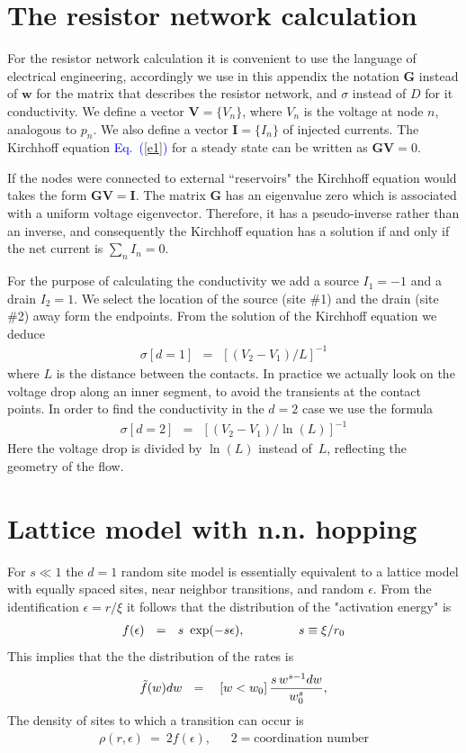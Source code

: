 \documentclass[aps,prb,floats,floatfix,twocolumn]{revtex4}
\newcommand{\mylabel}[1]{\label{#1}}
\newcommand{\beq}{\begin{eqnarray}}
\newcommand{\eeq}{\end{eqnarray}}
\newcommand{\be}[1]{\begin{eqnarray}\ifthenelse{#1=-1}
{\nonumber}{\ifthenelse{#1=0}{}{\mylabel{e#1}}}}
\newcommand{\Eq}[1]{\textcolor{blue}{Eq.\!\!~(\ref{#1})}}
\begin{document}
\section{The resistor network calculation}
\label{res}

For the resistor network calculation it is convenient 
to use the language of electrical engineering, 
accordingly we use in this appendix the notation $\bm{G}$ 
instead of $\bm{w}$ for the matrix that describes the 
resistor network, and $\sigma$ instead of $D$ for it conductivity. 
We define a vector $\bm{V}=\{V_n\}$, where $V_n$ is the voltage 
at node $n$, analogous to $p_n$. We also define a vector $\bm{I}=\{I_n\}$ 
of injected currents. The Kirchhoff equation \Eq{e1} for a steady 
state can be written as $\bm{G} \bm{V}=0$. 



If the nodes were connected to external ``reservoirs" 
the Kirchhoff equation would takes the form $\bm{G} \bm{V}=\bm{I}$. 
The matrix $\bm{G}$ has an eigenvalue zero which is associated  
with a uniform voltage eigenvector. Therefore, it has 
a pseudo-inverse rather than an inverse, and consequently 
the Kirchhoff equation has a solution if and only 
if the net current is ${\sum_n I_n=0}$.      


For the purpose of calculating the conductivity
we add a source ${I_1=-1}$ and a drain ${I_2=1}$.
We select the location of the source (site \#1) 
and the drain (site \#2) away form the endpoints. 
From the solution of the Kirchhoff equation we deduce 
%
\beq
\sigma [d{=}1] \ \ = \ \ \left[(V_2-V_1)/L\right]^{-1} 
\eeq
%
where $L$ is the distance between the contacts.   
In practice we actually look on the  
voltage drop along an inner segment, 
to avoid the transients at the contact points.
%
In order to find the conductivity in the $d{=}2$ case 
we use the formula 
%
\beq
\sigma [d{=}2] \ \ = \ \ \left[(V_2-V_1)/\ln(L)\right]^{-1} 
\eeq
%
Here the voltage drop is divided by $\ln(L)$ instead of~$L$, 
reflecting the geometry of the flow.




\section{Lattice model with n.n. hopping}

\label{aLattice}

For $s \ll 1$ the $d{=}1$ random site model is 
essentially equivalent to a lattice model 
with equally spaced sites, 
near neighbor transitions, 
and random $\epsilon$.
From the identification $\epsilon=r/\xi$ 
it follows that the distribution 
of the "activation energy" is 
%
\beq
f(\epsilon) \ \ = \ \ s \ \exp(-s\epsilon), 
\hspace{15mm} s \equiv \xi/r_0
\eeq
%
This implies that the the distribution of the rates is 
%
\be{15}
\tilde{f}(w) dw  \ \  =  \ \    \ [w < w_0] \, \frac{s \, w^{s-1} dw}{w_0^s}, 
\eeq
%
The density of sites to which a transition can occur is
%
\beq
\rho(r,\epsilon) \ = \ 2f(\epsilon), 
\ \ \ \ \ \ \ 2=\text{coordination number} 
\eeq 
\end{document}
